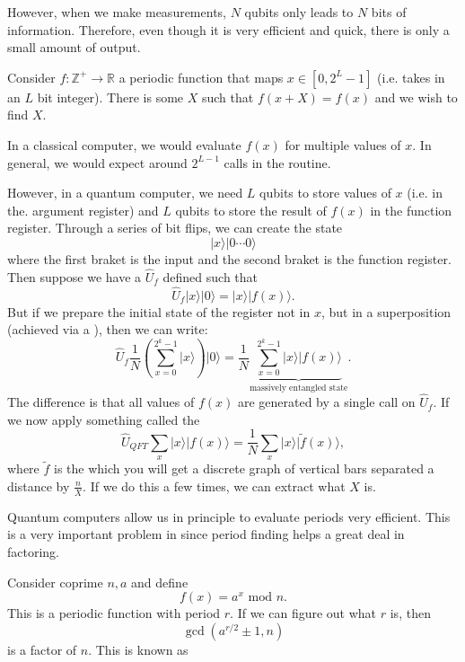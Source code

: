\documentclass{article}
\numberwithin{equation}{section}
\begin{document}
However, when we make measurements, $N$ qubits only leads to $N$ bits of information. Therefore, even though it is very efficient and quick, there is only a small amount of output.
\begin{example}
    Consider $f:\mathbb{Z}^+\rightarrow \mathbb{R}$ a periodic function that maps $x\in [0,2^L-1]$ (i.e. takes in an $L$ bit integer). There is some $X$ such that $f(x+X)=f(x)$ and we wish to find $X$.
    \vspace{2mm}

    In a classical computer, we would evaluate $f(x)$ for multiple values of $x$. In general, we would expect around $2^{L-1}$ calls in the routine.
    \vspace{2mm}

    However, in a quantum computer, we need $L$ qubits to store values of $x$ (i.e. in the. argument register) and $L$ qubits to store the result of $f(x)$ in the function register. Through a series of bit flips, we can create the state 
    \begin{equation}
        |x\rangle|0\cdots 0\rangle
    \end{equation}
    where the first braket is the input and the second braket is the function register. Then suppose we have a  $\hat{U}_f$ defined such that
    \begin{equation}
        \hat{U}_f|x\rangle |0\rangle = |x\rangle |f(x)\rangle.
    \end{equation}
    But if we prepare the initial state of the register not in $x$, but in a superposition (achieved via a ), then we can write:
    \begin{equation}
        \hat{U}_f\frac{1}{N}\left(\sum_{x=0}^{2^k-1} |x\rangle\right)|0\rangle = \frac{1}{N} \underbrace{\sum_{x=0}^{2^k-1} |x\rangle |f(x)\rangle}_{\text{massively entangled state}}.
    \end{equation}
    The difference is that all values of $f(x)$ are generated by a single call on $\hat{U}_f$. If we now apply something called the 
    \begin{equation}
        \hat{U}_{QFT}\sum_x |x\rangle |f(x)\rangle = \frac{1}{N} \sum_x |x\rangle |\tilde{f}(x)\rangle,
    \end{equation}
    where $\tilde{f}$ is the  which you will get a discrete graph of vertical bars separated a distance by $\frac{n}{X}.$ If we do this a few times, we can extract what $X$ is.
\end{example}
Quantum computers allow us in principle to evaluate periods very efficient. This is a very important problem in  since period finding helps a great deal in factoring.

Consider coprime $n,a$ and define 
\begin{equation}
    f(x) = a^x \text{ mod } n.
\end{equation} 
This is a periodic function with period $r$. If we can figure out what $r$ is, then
\begin{equation}
    \gcd(a^{r/2} \pm 1, n)
\end{equation}
is a factor of $n$. This is known as 
\end{document}
